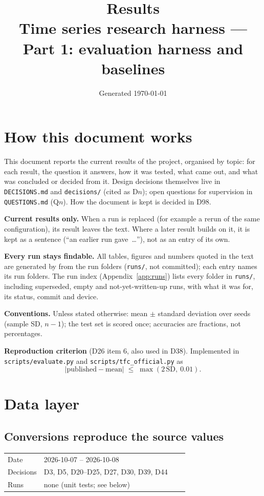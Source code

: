 \documentclass[11pt,a4paper]{article}
\title{Results\\[2pt]\large Time series research harness --- Part 1: evaluation harness and baselines}
\author{}
\date{Generated \today}
\makeatletter
\newcommand{\entry}[5]{%
  \subsection{#2}\label{#1}
  \begin{tabular}{@{}>{\footnotesize\color{muted}}l>{\footnotesize}p{0.8\linewidth}@{}}
    Date & #3 \\ Decisions & #4 \\ Runs & #5
  \end{tabular}\par}
\makeatother
\begin{document}
\maketitle
\tableofcontents

\section{How this document works}

This document reports the current results of the project, organised by topic: for each
result, the question it answers, how it was tested, what came out, and what was concluded
or decided from it. Design decisions themselves live in \texttt{DECISIONS.md} and
\texttt{decisions/} (cited as D$n$); open questions for supervision in
\texttt{QUESTIONS.md} (Q$n$). How the document is kept is decided in D98.

\textbf{Current results only.} When a run is replaced (for example a rerun of the same
configuration), its result leaves the text. Where a later result builds on it, it is kept
as a sentence (``an earlier run gave~\ldots''), not as an entry of its own.

\textbf{Every run stays findable.} All tables, figures and numbers quoted in the text are
generated by  from the run folders (\texttt{runs/}, not
committed); each entry names its run folders. The run index
(Appendix~\ref{app:runs}) lists every folder in \texttt{runs/}, including superseded,
empty and not-yet-written-up runs, with what it was for, its status, commit and device.

\textbf{Conventions.} Unless stated otherwise: mean $\pm$ standard deviation over seeds
(sample SD, $n-1$); the test set is scored once; accuracies are fractions, not
percentages.

\textbf{Reproduction criterion} (D26 item 6, also used in D38). Implemented in
\texttt{scripts/evaluate.py} and \texttt{scripts/tfc\_official.py} as
\[
  |\text{published} - \text{mean}| \;\le\; \max(2\,\mathrm{SD},\ 0.01).
\]



\section{Data layer}

\entry{data-conversion}{Conversions reproduce the source values}{2026-10-07 -- 2026-10-08}
  {D3, D5, D20--D25, D27, D30, D39, D44}{none (unit tests; see below)}
\end{document}
